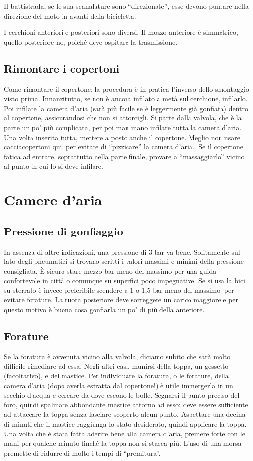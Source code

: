 Il battistrada, se le sua scanalature sono ``direzionate'', esse devono puntare nella direzione del moto in avanti della bicicletta.

I cerchioni anteriori e posteriori sono diversi.
Il mozzo anteriore è simmetrico, quello posteriore no, poiché deve ospitare la trasmissione.

\subsection*{Rimontare i copertoni}
Come rimontare il copertone: la procedura è in pratica l'inverso dello smontaggio visto prima.
Innanzitutto, se non è ancora infilato a metà sul cerchione, infilarlo.
Poi infilare la camera d'aria (sarà più facile se è leggermente già gonfiata) dentro al copertone, assicurandosi che non si attorcigli.
Si parte dalla valvola, che è la parte un po' più complicata, per poi man mano infilare tutta la camera d'aria.
Una volta inserita tutta, mettere a posto anche il copertone.
Meglio non usare cacciacopertoni qui, per evitare di ``pizzicare'' la camera d'aria..
Se il copertone fatica ad entrare, soprattutto nella parte finale, provare a ``massaggiarlo'' vicino al punto in cui lo si deve infilare.

\section*{Camere d'aria}
\subsection*{Pressione di gonfiaggio}
In assenza di altre indicazioni, una pressione di 3 bar va bene.
Solitamente sul lato degli pneumatici si trovano scritti i valori massimi e minimi della pressione consigliata.
È sicuro stare mezzo bar meno del massimo per una guida confortevole in città o comunque su superfici poco impegnative.
Se si usa la bici su sterrato è invece preferibile scendere a 1 o 1,5 bar meno del massimo, per evitare forature.
La ruota posteriore deve sorreggere un carico maggiore e per questo motivo è buona cosa gonfiarla un po' di più della anteriore.

\subsection*{Forature}
Se la foratura è avvenuta vicino alla valvola, diciamo subito che sarà molto difficile rimediare ad essa.
Negli altri casi, munirsi della toppa, un gessetto (facoltativo), e del mastice.
Per individuare la foratura, o le forature, della camera d'aria (dopo averla estratta dal copertone!) è utile immergerla in un secchio d'acqua e cercare da dove escono le bolle.
Segnarsi il punto preciso del foro, quindi spalmare abbondante mastice attorno ad esso: deve essere sufficiente ad attaccare la toppa senza lasciare scoperto alcun punto.
Aspettare una decina di minuti che il mastice raggiunga lo stato desiderato, quindi applicare la toppa.
Una volta che è stata fatta aderire bene alla camera d'aria, premere forte con le mani per qualche minuto finché la toppa non si stacca più.
L'uso di una morsa premette di ridurre di molto i tempi di ``premitura''.

